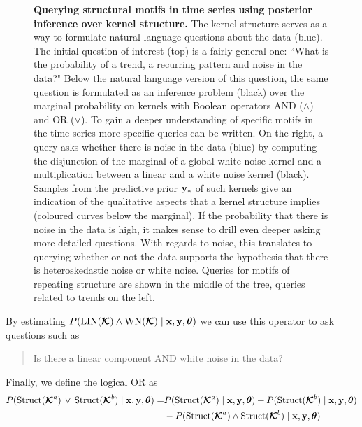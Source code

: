\begin{figure}
\centering

\caption{{\footnotesize \bf Querying structural motifs in time series using posterior inference
over kernel structure.} The kernel structure serves as a way to formulate
natural language questions about the data (blue). The initial question of interest
(top) is a fairly
general one: ``What is the probability of a trend, a recurring
pattern and noise in the data?" Below the natural language version of this
question, the same question is formulated as an inference problem (black) over the
marginal probability on kernels with Boolean operators AND ($\land$) and OR ($\lor$). 
To gain  a deeper understanding of specific motifs in the time series more specific queries can
be written.
On the right, a query asks whether there is noise in the data (blue) by computing the disjunction of the marginal
of a global white noise kernel and a multiplication between a linear and a white
noise kernel (black). Samples from the predictive prior $\mathbf{y}_*$ of such kernels give an
indication of the qualitative aspects that a kernel structure implies (coloured curves below
the marginal). 
If the probability that there is noise in the data is high, it makes sense
to drill even deeper asking more detailed questions. With regards to noise, this
translates to querying whether or not the data supports the hypothesis that there is
heteroskedastic noise or white noise. Queries for motifs of repeating structure
are shown in the middle of the tree, queries related to trends on the left.}\label{fig:query}
\end{figure}
By estimating $P(\text{LIN}(\bm{\mathcal{K}}) \land \text{WN}(\bm{\mathcal{K}}) \mid \mathbf{x}, \mathbf{y}, \bm{\theta})$ we can use this operator to ask questions such as 
\begin{quotation}
Is there a linear component AND white noise in the data? 
\end{quotation}
Finally, we define the logical OR as
\begin{align*}
P(\text{Struct}(\bm{\mathcal{K}}^a)\, \lor\, \text{Struct}(\bm{\mathcal{K}}^b) \mid \mathbf{x}, \mathbf{y}, \bm{\theta})
=& P(\text{Struct}(\bm{\mathcal{K}}^a) \mid \mathbf{x}, \mathbf{y}, \bm{\theta}) + P(\text{Struct}(\bm{\mathcal{K}}^b) \mid \mathbf{x}, \mathbf{y}, \bm{\theta})\\
 &- P(\text{Struct}(\bm{\mathcal{K}}^a) \land \text{Struct}(\bm{\mathcal{K}}^b) \mid \mathbf{x}, \mathbf{y}, \bm{\theta})
\end{align*}

